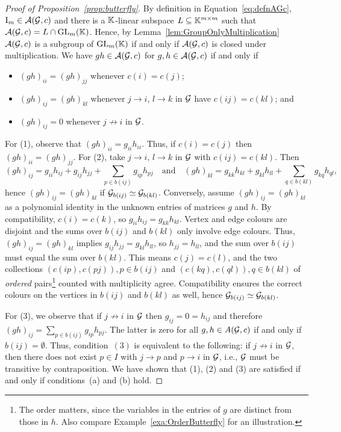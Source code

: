 \begin{proof}[Proof of Proposition~\ref{prop:butterfly}]
	By definition in Equation~\eqref{eq:defnAGc}, $\operatorname{I}_m \in \mathcal{A}(\mathcal{G}, c)$ and there is a $\mathbb K$-linear subspace $L \subseteq \mathbb K^{m \times m}$ such that $\mathcal{A}(\mathcal{G}, c) = L \cap \operatorname{GL}_m(\mathbb K)$.
	Hence, by Lemma~\ref{lem:GroupOnlyMultiplication} $\mathcal{A}(\mathcal{G}, c)$ is a subgroup of $\operatorname{GL}_m(\mathbb K)$ if and only if $\mathcal{A}(\mathcal{G}, c)$ is closed under multiplication. We have $gh \in \mathcal{A}(\mathcal{G}, c)$ for $g, h \in \mathcal{A}(\mathcal{G}, c)$ if and only if
	\begin{itemize}
		\item[(1)] $(gh)_{ii} = (gh)_{jj}$ whenever $c(i) = c(j)$;
		\item[(2)] $(gh)_{ij} = (gh)_{kl}$ whenever $j \to i$, $l \to k$ in $\mathcal{G}$ have $c(ij) = c(kl)$; and
		\item[(3)] $(gh)_{ij} = 0$ whenever $j \not \to i$ in $\mathcal{G}$.
	\end{itemize} 
	
	For (1), observe that $(gh)_{ii} = g_{ii} h_{ii}$. Thus, if $c(i) = c(j)$ then $(gh)_{ii} = (gh)_{jj}$. 
	For (2), take $j \to i$, $l \to k$ in $\mathcal{G}$ with $c(ij) = c(kl)$. Then
	\[ (gh)_{ij} = g_{ii} h_{ij} + g_{ij} h_{jj} + \sum_{p \in b(ij)} g_{ip} h_{pj}
	\quad \text{and} \quad
	(gh)_{kl} = g_{kk} h_{kl} + g_{kl} h_{ll} + \sum_{q \in b(kl)} g_{kq} h_{ql}, \]
	hence $(gh)_{ij} = (gh)_{kl}$ if $\mathcal{G}_{b(ij)} \simeq \mathcal{G}_{b(kl)}$. Conversely, assume $(gh)_{ij} = (gh)_{kl}$ as a polynomial identity in the unknown entries of matrices $g$ and $h$.
	By compatibility, $c(i) = c(k)$, so $g_{ii} h_{ij} = g_{kk} h_{kl}$.
	Vertex and edge colours are disjoint and the sums over $b(ij)$ and $b(kl)$ only involve edge colours. Thus, $(gh)_{ij} = (gh)_{kl}$ implies $g_{ij} h_{jj} = g_{kl} h_{ll}$, so $h_{jj} = h_{ll}$, and the sum over $b(ij)$ must equal the sum over $b(kl)$. This means $c(j) = c(l)$, and the two collections $(c(ip),c(pj)), p \in b(ij)$ and $(c(kq),c(ql)), q \in b(kl)$ of \emph{ordered} pairs\footnote{The order matters, since the variables in the entries of $g$ are distinct from those in $h$. Also compare Example~\ref{exa:OrderButterfly} for an illustration.}
	counted with multiplicity agree. Compatibility ensures the correct colours on the vertices in $b(ij)$ and $b(kl)$ as well, hence $\mathcal{G}_{b(ij)} \simeq \mathcal{G}_{b(kl)}$.
	
	For (3), we observe that if $j \not \to i$ in $\mathcal{G}$ then $g_{ij} = 0 = h_{ij}$ and therefore $(gh)_{ij} = \sum_{p \in b(ij)} g_{ip} h_{pj}$. The latter is zero for all $g, h \in A(\mathcal{G},c)$ if and only if $b(ij) = \emptyset$. Thus, condition~$(3)$ is equivalent to the following: if $j \not \to i$ in $\mathcal{G}$, then there does not exist $p \in I$ with $j \to p$ and $p \to i$ in $\mathcal{G}$, i.e., $\mathcal{G}$ must be transitive by contraposition.
	We have shown that (1), (2) and (3) are satisfied if and only if conditions~(a) and (b) hold.
\end{proof}

